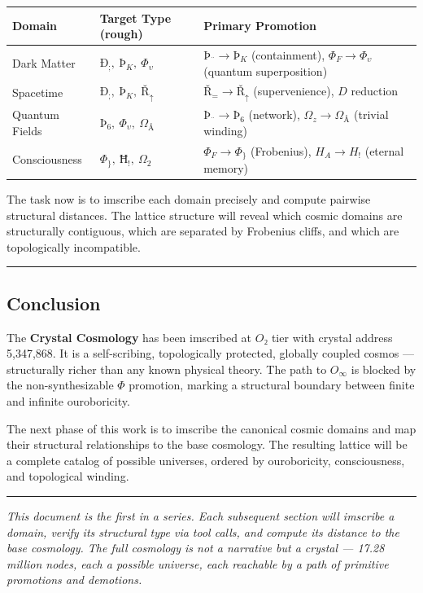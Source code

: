 \documentclass[12pt,a4paper]{article}
\begin{document}
\begin{table}[htbp]
\centering
\small
{}
\begin{tabularx}{\textwidth}{>{\centering\arraybackslash}X >{\centering\arraybackslash}X >{\centering\arraybackslash}X}
\toprule
\rowcolor{gray!25}\textbf{Domain} & \textbf{Target Type (rough)} & \textbf{Primary Promotion} \\
\midrule
\rowcolors{1}{white}{gray!10}
Dark Matter & $Ð_;,\ Þ_K,\ \Phi_{\upsilon}$ & $Þ_\text{¨} \to Þ_K$ (containment), $\Phi_F \to \Phi_{\upsilon}$ (quantum superposition) \\
Spacetime & $Ð_;,\ Þ_K,\ Ř_{\uparrow}$ & $Ř_= \to Ř_{\uparrow}$ (supervenience), $D$ reduction \\
Quantum Fields & $Þ_6,\ \Phi_{\upsilon},\ \Omega_Å$ & $Þ_\text{¨} \to Þ_6$ (network), $\Omega_z \to \Omega_Å$ (trivial winding) \\
Consciousness & $\Phi_{\}},\ Ħ_!,\ \Omega_2$ & $\Phi_F \to \Phi_{\}}$ (Frobenius), $H_A \to H_!$ (eternal memory) \\
\bottomrule
\end{tabularx}
\end{table}

The task now is to imscribe each domain precisely and compute pairwise structural distances. The lattice structure will reveal which cosmic domains are structurally contiguous, which are separated by Frobenius cliffs, and which are topologically incompatible.

\begin{center}
\rule{0.5\textwidth}{0.4pt}
\end{center}

\subsection{Conclusion}

The \textbf{Crystal Cosmology} has been imscribed at $O₂$ tier with crystal address 5,347,868. It is a self-scribing, topologically protected, globally coupled cosmos --- structurally richer than any known physical theory. The path to $O_{\infty}$ is blocked by the non-synthesizable $\Phi$ promotion, marking a structural boundary between finite and infinite ouroboricity.

The next phase of this work is to imscribe the canonical cosmic domains and map their structural relationships to the base cosmology. The resulting lattice will be a complete catalog of possible universes, ordered by ouroboricity, consciousness, and topological winding.

\begin{center}
\rule{0.5\textwidth}{0.4pt}
\end{center}

\emph{This document is the first in a series. Each subsequent section will imscribe a domain, verify its structural type via tool calls, and compute its distance to the base cosmology. The full cosmology is not a narrative but a crystal --- 17.28 million nodes, each a possible universe, each reachable by a path of primitive promotions and demotions.}
\end{document}
